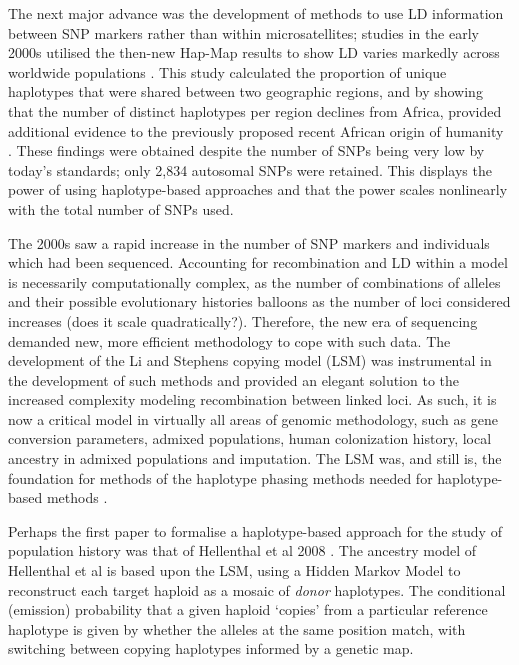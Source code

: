 The next major advance was the development of methods to use LD information between SNP markers rather than within microsatellites; studies in the early 2000s utilised the then-new Hap-Map results to show LD varies markedly across worldwide populations \cite{conrad2006worldwide}. This study calculated the proportion of unique haplotypes that were shared between two geographic regions, and by showing that the number of distinct haplotypes per region declines from Africa, provided additional evidence to the previously proposed recent African origin of humanity \cite{cann1987mitochondrial}. These findings were obtained despite the number of SNPs being very low by today's standards; only 2,834 autosomal SNPs were retained. This displays the power of using haplotype-based approaches and that the power scales nonlinearly with the total number of SNPs used.  

 
The 2000s saw a rapid increase in the number of SNP markers and individuals which had been sequenced. Accounting for recombination and LD within a model is necessarily computationally complex, as the number of combinations of alleles and their possible evolutionary histories balloons as the number of loci considered increases (does it scale quadratically?). Therefore, the new era of sequencing demanded new, more efficient methodology to cope with such data. The development of the Li and Stephens copying model (LSM) \cite{Li2003} was instrumental in the development of such methods \cite{song2016li} and provided an elegant solution to the increased complexity modeling recombination between linked loci. As such, it is now a critical model in virtually all areas of genomic methodology, such as gene conversion parameters, admixed populations, human colonization history, local ancestry in admixed populations and imputation. The LSM was, and still is, the foundation for methods of the haplotype phasing methods needed for haplotype-based methods \cite{stephens2003comparison, stephens2005accounting}. 

Perhaps the first paper to formalise a haplotype-based approach for the study of population history was that of Hellenthal et al 2008 \cite{hellenthal2008inferring}. The ancestry model of Hellenthal et al is based upon the LSM, using a Hidden Markov Model to reconstruct each target haploid as a mosaic of \textit{donor} haplotypes. The conditional (emission) probability that a given haploid `copies' from a particular reference haplotype is given by whether the alleles at the same position match, with switching between copying haplotypes informed by a genetic map. 

